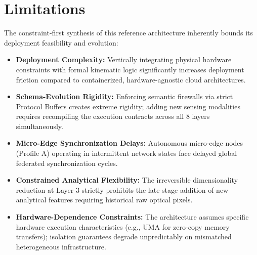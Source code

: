 \documentclass[conference]{IEEEtran}
\begin{document}
\begin{table}[htbp]
\centering
\caption{Comparative Reference Architecture Taxonomy}
\label{tab:arch_comparison}
\begin{center}
\end{center}
\end{table}

\section{Limitations}
The constraint-first synthesis of this reference architecture inherently bounds its deployment feasibility and evolution:
\begin{itemize}
    \item \textbf{Deployment Complexity:} Vertically integrating physical hardware constraints with formal kinematic logic significantly increases deployment friction compared to containerized, hardware-agnostic cloud architectures.
    \item \textbf{Schema-Evolution Rigidity:} Enforcing semantic firewalls via strict Protocol Buffers creates extreme rigidity; adding new sensing modalities requires recompiling the execution contracts across all 8 layers simultaneously.
    \item \textbf{Micro-Edge Synchronization Delays:} Autonomous micro-edge nodes (Profile A) operating in intermittent network states face delayed global federated synchronization cycles.
    \item \textbf{Constrained Analytical Flexibility:} The irreversible dimensionality reduction at Layer 3 strictly prohibits the late-stage addition of new analytical features requiring historical raw optical pixels.
    \item \textbf{Hardware-Dependence Constraints:} The architecture assumes specific hardware execution characteristics (e.g., UMA for zero-copy memory transfers); isolation guarantees degrade unpredictably on mismatched heterogeneous infrastructure.
\end{itemize}
\end{document}
